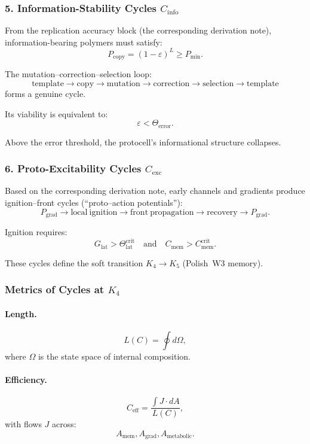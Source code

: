 \subsubsection{5. Information-Stability Cycles $C_{\mathrm{info}}$}

From the replication accuracy block (the corresponding derivation note),
information-bearing polymers must satisfy:
\[
  P_{\mathrm{copy}}=(1-\varepsilon)^L \ge P_{\min}.
\]

The mutation–correction–selection loop:
\[
  \mathrm{template}
  \to \mathrm{copy}
  \to \mathrm{mutation}
  \to \mathrm{correction}
  \to \mathrm{selection}
  \to \mathrm{template}
\]
forms a genuine cycle.

Its viability is equivalent to:
\[
  \varepsilon < \Theta_{\mathrm{error}}.
\]

Above the error threshold, the protocell’s informational structure
collapses.

\subsubsection{6. Proto-Excitability Cycles $C_{\mathrm{exc}}$}

Based on the corresponding derivation note, early channels and gradients produce
ignition–front cycles (“proto–action potentials”):
\[
  P_{\mathrm{grad}} \to
  \mathrm{local\ ignition} \to
  \mathrm{front\ propagation} \to
  \mathrm{recovery} \to
  P_{\mathrm{grad}}.
\]

Ignition requires:
\[
  G_{\mathrm{lat}} > \Theta^{\mathrm{crit}}_{\mathrm{lat}}
\quad\text{and}\quad
  C_{\mathrm{mem}}>C_{\mathrm{mem}}^{\mathrm{crit}}.
\]

These cycles define the soft transition $K_4\to K_5$
(Polish~W3 memory).

\subsubsection{Metrics of Cycles at \texorpdfstring{$K_4$}{K_4}}

\paragraph{Length.}
\[
  L(C)=\oint d\Omega,
\]
where $\Omega$ is the state space of internal composition.

\paragraph{Efficiency.}
\[
  C_{\mathrm{eff}}
    =\frac{\int J\cdot dA}{L(C)},
\]
with flows $J$ across:
\[
  A_{\mathrm{mem}}, A_{\mathrm{grad}}, A_{\mathrm{metabolic}}.
\]


